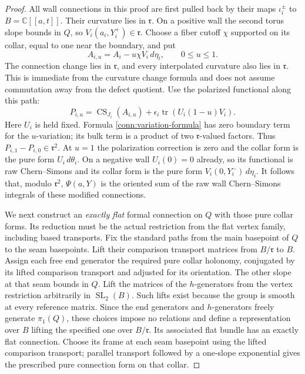 \begin{proof}
All wall connections in this proof are first pulled back
by their maps \(\iota_i^\pm\) to \(B=\mathbb C[[a,t]]\).
Their curvature lies in \(\mathfrak r\).
On a positive wall the second torus slope bounds in
\(Q\), so \(V_i(a_i,Y_i^+)\in\mathfrak r\).
Choose a fiber cutoff \(\chi\) supported on its collar,
equal to one near the boundary, and put
\[
 A_{i,u}=A_i-u\chi V_i\,d\eta_i,\qquad 0\leq u\leq1 .
\]
The connection change lies in \(\mathfrak r\), and
every interpolated curvature also lies in
\(\mathfrak r\).  This is immediate from the curvature
change formula and does not assume commutation away
from the defect quotient.
Use the polarized functional along this path:
\[
 P_{i,u}=\operatorname{CS}_{J_i}(A_{i,u})
                  +\epsilon_i\operatorname{tr}(U_i(1-u)V_i).
\]
Here \(U_i\) is held fixed.  Formula
\eqref{conn:variation-formula} has zero boundary term
for the \(u\)-variation; its bulk term is a product of
two \(\mathfrak r\)-valued factors.  Thus
\(P_{i,1}-P_{i,0}\in\mathfrak r^2\).
At \(u=1\) the polarization correction is zero and
the collar form is the pure form \(U_i\,d\theta_i\).
On a negative wall \(U_i(0)=0\) already, so its
functional is raw Chern--Simons and its collar form
is the pure form \(V_i(0,Y_i^-)\,d\eta_i\).
It follows that, modulo \(\mathfrak r^2\),
\(\Psi(a,Y)\) is the oriented sum of the raw wall
Chern--Simons integrals of these modified connections.

We next construct an \emph{exactly flat} formal
connection on \(Q\) with those pure collar forms.
Its reduction must be the actual restriction from
the flat vertex family, including based transports.
Fix the standard paths from the main basepoint of
\(Q\) to the seam basepoints.  Lift their comparison
transport matrices from \(B/\mathfrak r\) to \(B\).
Assign each free end generator the required pure
collar holonomy, conjugated by its lifted comparison
transport and adjusted for its orientation.
The other slope at that seam bounds in \(Q\).
Lift the matrices of the \(h\)-generators from the
vertex restriction arbitrarily in
\(\operatorname{SL}_2(B)\).  Such lifts exist because
the group is smooth at every reference matrix.
Since the end generators and \(h\)-generators freely
generate \(\pi_1(Q)\), these choices impose no
relations and define a representation over \(B\)
lifting the specified one over \(B/\mathfrak r\).
Its associated flat bundle has an exactly flat
connection.  Choose its frame at each seam basepoint
using the lifted comparison transport; parallel
transport followed by a one-slope exponential gives
the prescribed pure connection form on that collar.


\end{proof}
